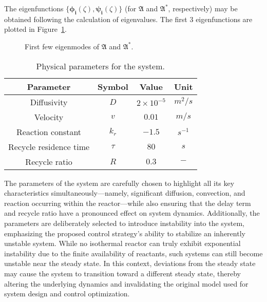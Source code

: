 The eigenfunctions $\{ \bm{\phi_i}(\zeta), \bm{\psi_i}(\zeta) \}$ (for $\mathfrak{A}$ and $\mathfrak{A}^*$, respectively) may be obtained following the calculation of eigenvalues. The first 3 eigenfunctions are plotted in Figure~\ref{fig:eigfun}. 

\begin{figure}[H]
    \centering
    
    \caption{First few eigenmodes of $\mathfrak{A}$ and $\mathfrak{A}^*$.}
    \label{fig:eigfun}
\end{figure}

\begin{table}[ht]
    \centering
    \caption{Physical parameters for the system.}
    \label{tab:pars}
    \begin{tabular}{|c|c|c|c|}
    \hline
    \textbf{Parameter}        & \textbf{Symbol} & \textbf{Value}     & \textbf{Unit}    \\ \hline
    Diffusivity               & $D$             & $2\times10^{-5}$   & ${m^2}/{s}$      \\ \hline
    Velocity                  & $v$             & $0.01$   & ${m}/{s}$        \\ \hline
    Reaction constant         & $k_r$           & $-1.5$              & $s^{-1}$         \\ \hline
    Recycle residence time    & $\tau$          & $80$               & $s$              \\ \hline
    Recycle ratio             & $R$             & $0.3$              & $-$              \\ \hline
    \end{tabular}
\end{table}

The parameters of the system are carefully chosen to highlight all its key characteristics simultaneously—namely, significant diffusion, convection, and reaction occurring within the reactor—while also ensuring that the delay term and recycle ratio have a pronounced effect on system dynamics. Additionally, the parameters are deliberately selected to introduce instability into the system, emphasizing the proposed control strategy's ability to stabilize an inherently unstable system. While no isothermal reactor can truly exhibit exponential instability due to the finite availability of reactants, such systems can still become unstable near the steady state. In this context, deviations from the steady state may cause the system to transition toward a different steady state, thereby altering the underlying dynamics and invalidating the original model used for system design and control optimization.

